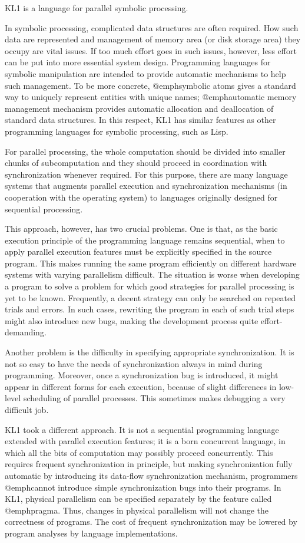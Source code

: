 KL1 is a language for parallel symbolic processing.

In symbolic processing, complicated data structures are often required.
How such data are represented and management of memory area (or disk
storage area) they occupy are vital issues.  If too much effort goes in
such issues, however, less effort can be put into more essential system
design.  Programming languages for symbolic manipulation are intended to
provide automatic mechanisms to help such management.  To be more
concrete, @emph{symbolic atoms} gives a standard way to uniquely
represent entities with unique names; @emph{automatic memory management}
mechanism provides automatic allocation and deallocation of standard
data structures.  In this respect, KL1 has similar features as other
programming languages for symbolic processing, such as Lisp.

For parallel processing, the whole computation should be divided into
smaller chunks of subcomputation and they should proceed in coordination
with synchronization whenever required.  For this purpose, there are
many language systems that augments parallel execution and
synchronization mechanisms (in cooperation with the operating system) to
languages originally designed for sequential processing.

This approach, however, has two crucial problems.  One is that, as the
basic execution principle of the programming language remains
sequential, when to apply parallel execution features must be explicitly
specified in the source program.  This makes running the same program
efficiently on different hardware systems with varying parallelism
difficult.  The situation is worse when developing a program to solve a
problem for which good strategies for parallel processing is yet to be
known.  Frequently, a decent strategy can only be searched on repeated
trials and errors.  In such cases, rewriting the program in each of such
trial steps might also introduce new bugs, making the development
process quite effort-demanding.

Another problem is the difficulty in specifying appropriate
synchronization.  It is not so easy to have the needs of synchronization
always in mind during programming.  Moreover, once a synchronization bug
is introduced, it might appear in different forms for each execution,
because of slight differences in low-level scheduling of parallel
processes.  This sometimes makes debugging a very difficult job.

KL1 took a different approach.  It is not a sequential programming
language extended with parallel execution features; it is a born
concurrent language, in which all the bits of computation may possibly
proceed concurrently.  This requires frequent synchronization in
principle, but making synchronization fully automatic by introducing its
data-flow synchronization mechanism, programmers @emph{cannot} introduce
simple synchronization bugs into their programs.  In KL1, physical
parallelism can be specified separately by the feature called
@emph{pragma}. Thus, changes in physical parallelism will not change the
correctness of programs.  The cost of frequent synchronization may be
lowered by program analyses by language implementations.

